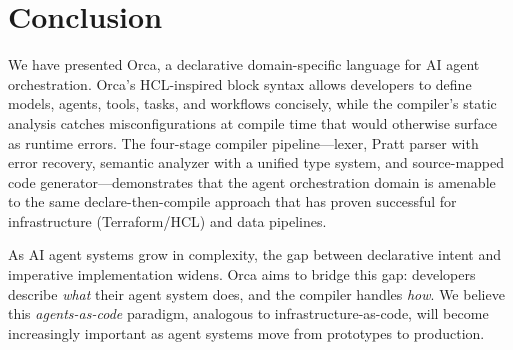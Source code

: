 \documentclass[sigconf,nonacm]{acmart}
\begin{document}
\section{Conclusion}
\label{sec:conclusion}

We have presented Orca, a declarative domain-specific language for AI
agent orchestration. Orca's HCL-inspired block syntax allows developers
to define models, agents, tools, tasks, and workflows concisely, while
the compiler's static analysis catches misconfigurations at compile time
that would otherwise surface as runtime errors. The four-stage compiler
pipeline---lexer, Pratt parser with error recovery, semantic analyzer with
a unified type system, and source-mapped code generator---demonstrates that
the agent orchestration domain is amenable to the same
declare-then-compile approach that has proven successful for infrastructure
(Terraform/HCL) and data pipelines.

As AI agent systems grow in complexity, the gap between declarative intent
and imperative implementation widens. Orca aims to bridge this gap:
developers describe \emph{what} their agent system does, and the compiler
handles \emph{how}. We believe this \emph{agents-as-code} paradigm,
analogous to infrastructure-as-code, will become increasingly important as
agent systems move from prototypes to production.



\end{document}
